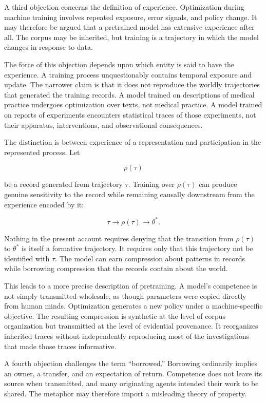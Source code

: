 \documentclass[11pt]{article}
\begin{document}
A third objection concerns the definition of experience. Optimization during machine training involves repeated exposure, error signals, and policy change. It may therefore be argued that a pretrained model has extensive experience after all. The corpus may be inherited, but training is a trajectory in which the model changes in response to data.

The force of this objection depends upon which entity is said to have the experience. A training process unquestionably contains temporal exposure and update. The narrower claim is that it does not reproduce the worldly trajectories that generated the training records. A model trained on descriptions of medical practice undergoes optimization over texts, not medical practice. A model trained on reports of experiments encounters statistical traces of those experiments, not their apparatus, interventions, and observational consequences.

The distinction is between experience of a representation and participation in the represented process. Let

\[
\rho(\tau)
\]

be a record generated from trajectory $\tau$. Training over $\rho(\tau)$ can produce genuine sensitivity to the record while remaining causally downstream from the experience encoded by it:

\[
\tau
\longrightarrow
\rho(\tau)
\longrightarrow
\theta^{*}.
\]

Nothing in the present account requires denying that the transition from $\rho(\tau)$ to $\theta^{*}$ is itself a formative trajectory. It requires only that this trajectory not be identified with $\tau$. The model can earn compression about patterns in records while borrowing compression that the records contain about the world.

This leads to a more precise description of pretraining. A model's competence is not simply transmitted wholesale, as though parameters were copied directly from human minds. Optimization generates a new policy under a machine-specific objective. The resulting compression is synthetic at the level of corpus organization but transmitted at the level of evidential provenance. It reorganizes inherited traces without independently reproducing most of the investigations that made those traces informative.

A fourth objection challenges the term ``borrowed.'' Borrowing ordinarily implies an owner, a transfer, and an expectation of return. Competence does not leave its source when transmitted, and many originating agents intended their work to be shared. The metaphor may therefore import a misleading theory of property.
\end{document}
